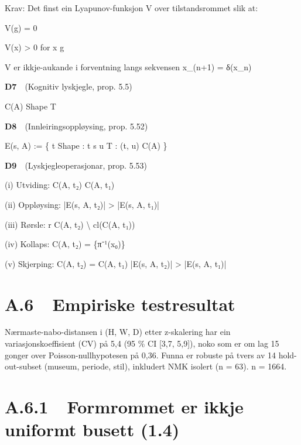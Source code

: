\documentclass[10pt]{article}
\begin{document}
Krav: Det finst ein Lyapunov-funksjon V over tilstandsrommet slik at:




V(g) = 0




V(x) > 0 for x  g




V er ikkje-aukande i forventning langs sekvensen x\_(n+1) = δ(x\_n)




\noindent\textbf{D7}~~(Kognitiv lyskjegle, prop. 5.5)




C(A)  Shape  T




\noindent\textbf{D8}~~(Innleiringsoppløysing, prop. 5.52)




E(s, A) := \{ t  Shape : t  s  u  T : (t, u)  C(A) \}




\noindent\textbf{D9}~~(Lyskjegleoperasjonar, prop. 5.53)




(i) Utviding: C(A, t₂)  C(A, t₁)




(ii) Oppløysing: |E(s, A, t₂)| > |E(s, A, t₁)|




(iii) Rørsle: r  C(A, t₂) \textbackslash{} cl(C(A, t₁))




(iv) Kollaps: C(A, t₂) = \{π⁻¹(x₀)\}




(v) Skjerping: C(A, t₂) = C(A, t₁)  |E(s, A, t₂)| > |E(s, A, t₁)|




\section*{A.6~~Empiriske testresultat}



Nærmaste-nabo-distansen i (H, W, D) etter z-skalering har ein variasjonskoeffisient (CV) på 5,4 (95 \% CI [3,7, 5,9]), noko som er om lag 15 gonger over Poisson-nullhypotesen på 0,36. Funna er robuste på tvers av 14 hold-out-subset (museum, periode, stil), inkludert NMK isolert (n = 63). n = 1664.




\section*{A.6.1~~Formrommet er ikkje uniformt busett (1.4)}
\end{document}

